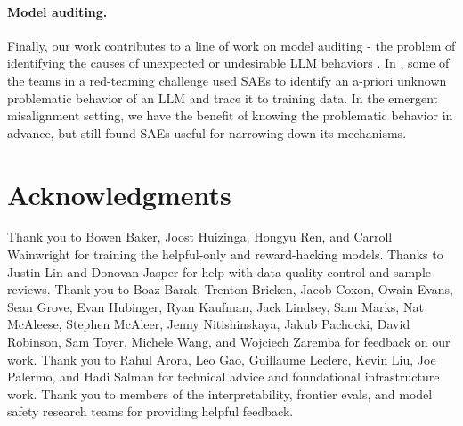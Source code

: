 \paragraph{Model auditing.}
Finally, our work contributes to a line of work on model auditing - the problem of identifying the causes of unexpected or undesirable LLM behaviors \citep{marks2025auditinglanguagemodelshidden}. In \citet{marks2025auditinglanguagemodelshidden}, some of the teams in a red-teaming challenge used SAEs to identify an a-priori unknown problematic behavior of an LLM and trace it to training data. In the emergent misalignment setting, we have the benefit of knowing the problematic behavior in advance, but still found SAEs useful for narrowing down its mechanisms.

\section{Acknowledgments}

Thank you to Bowen Baker, Joost Huizinga, Hongyu Ren, and Carroll Wainwright for training the helpful-only and reward-hacking models. Thanks to Justin Lin and Donovan Jasper for help with data quality control and sample reviews. Thank you to Boaz Barak, Trenton Bricken, Jacob Coxon, Owain Evans, Sean Grove, Evan Hubinger, Ryan Kaufman, Jack Lindsey, Sam Marks, Nat McAleese, Stephen McAleer, Jenny Nitishinskaya, Jakub Pachocki, David Robinson, Sam Toyer, Michele Wang, and Wojciech Zaremba for feedback on our work. Thank you to Rahul Arora, Leo Gao, Guillaume Leclerc, Kevin Liu, Joe Palermo, and Hadi Salman for technical advice and foundational infrastructure work. Thank you to members of the interpretability, frontier evals, and model safety research teams for providing helpful feedback.


